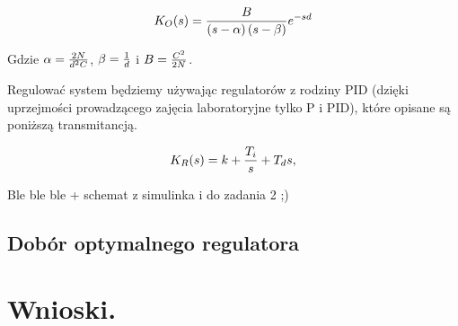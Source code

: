 \documentclass[a4paper,10pt]{article}
\begin{document}
\begin{equation} \label{eqn:transO}
	K_{O}(s)={B \over \left( s - \alpha \right) \left(s- \beta \right)}e^{-sd}
\end{equation}

Gdzie $\alpha = {2N \over d^{2}C}$, $\beta = {1 \over d}$ i $B = {C^2 \over 2N}$.

Regulować system będziemy używając regulatorów z rodziny PID (dzięki uprzejmości prowadzącego zajęcia laboratoryjne tylko P i PID), które opisane są poniższą transmitancją.

\begin{equation} \label{eqn:transR}
	K_{R}(s) = k + {T_{i} \over s} + T_{d}s ,
\end{equation}

Ble ble ble + schemat z simulinka i do zadania 2 ;)

\subsection{Dobór optymalnego regulatora}


\section{Wnioski.}\label{sec:wnioski}
\end{document}
